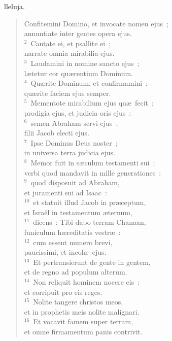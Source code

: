 \bchapter[Psalm]
lleluja. \begin{verse}Confitemini Domino, et invocate nomen ejus~;\\ annuntiate inter gentes opera ejus.\\
${}^{2}$~Cantate ei, et psallite ei~;\\ narrate omnia mirabilia ejus.\\
${}^{3}$~Laudamini in nomine sancto ejus~;\\ l\ae tetur cor qu\ae rentium Dominum.\\
${}^{4}$~Qu\ae rite Dominum, et confirmamini~;\\ qu\ae rite faciem ejus semper.\\
${}^{5}$~Mementote mirabilium ejus qu\ae\ fecit~;\\ prodigia ejus, et judicia oris ejus~:\\
${}^{6}$~semen Abraham servi ejus~;\\ filii Jacob electi ejus.\\
${}^{7}$~Ipse Dominus Deus noster~;\\ in universa terra judicia ejus.\\
${}^{8}$~Memor fuit in s\ae culum testamenti sui~;\\ verbi quod mandavit in mille generationes~:\\
${}^{9}$~quod disposuit ad Abraham,\\ et juramenti sui ad Isaac~:\\
${}^{10}$~et statuit illud Jacob in pr\ae ceptum,\\ et Isra\"el in testamentum \ae ternum,\\
${}^{11}$~dicens~: Tibi dabo terram Chanaan,\\ funiculum h\ae reditatis vestr\ae~:\\
${}^{12}$~cum essent numero brevi,\\ paucissimi, et incol\ae\ ejus.\\
${}^{13}$~Et pertransierunt de gente in gentem,\\ et de regno ad populum alterum.\\
${}^{14}$~Non reliquit hominem nocere eis~:\\ et corripuit pro eis reges.\\
${}^{15}$~Nolite tangere christos meos,\\ et in prophetis meis nolite malignari.\\
${}^{16}$~Et vocavit famem super terram,\\ et omne firmamentum panis contrivit.\\

\end{verse}
